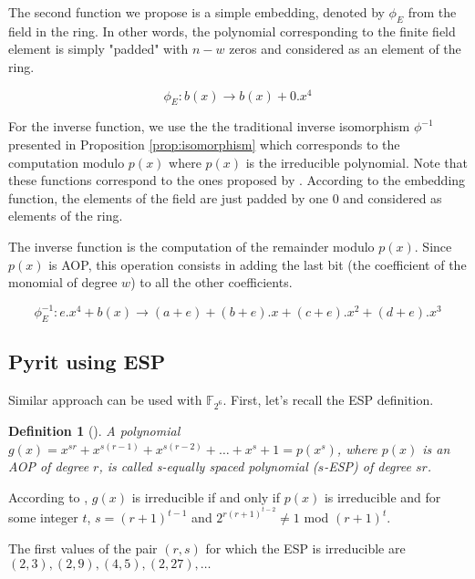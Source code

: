 \documentclass[conference]{IEEEtran}
\newtheorem{mydef}{Definition}
\begin{document}
The second function we propose is a simple embedding, denoted by $\phi_E$ from the field in the ring. In other words, the polynomial corresponding to the finite field element is simply "padded" with $n-w$ zeros and considered as an element of the ring. 

	\begin{displaymath}
		\phi_E : b(x) \rightarrow b(x) + 0.x^4
	\end{displaymath}

For the inverse function, we use the the traditional inverse isomorphism $\phi^{-1}$ presented in Proposition \ref{prop:isomorphism} which corresponds to the computation modulo $p(x)$ where $p(x)$ is the irreducible polynomial. Note that these functions correspond to the ones proposed by \cite{ITOH1989}. According to the embedding function, the elements of the field are just padded by one $0$ and considered as elements of the ring. 

The inverse function is the computation of the remainder modulo $p(x)$. Since $p(x)$ is AOP, this operation consists in adding the last bit (the coefficient of the monomial of degree $w$) to all the other coefficients. 

	\begin{displaymath}
		\phi_E^{-1} : e.x^4 + b(x) \rightarrow (a+e)+(b+e).x+(c+e).x^2+(d+e).x^3
	\end{displaymath}



\subsection{Pyrit using ESP}
\label{sec:esp}

Similar approach can be used with $\mathbb{F}_{2^6}$. First, let's recall the ESP definition.
\begin{mydef}[\cite{ITOH1989}]
	
	\label{def:esp}	
	A polynomial $g(x)=x^{sr}+x^{s(r-1)}+x^{s(r-2)}+\ldots + x^s + 1=p(x^s)$, where $p(x)$ is an AOP of degree $r$, is called s-equally spaced polynomial ($s$-ESP) of degree $sr$.
	
\end{mydef}

According to \cite[Theorem 3]{ITOH1989}, $g(x)$ is irreducible if and only if $p(x)$ is irreducible and for some integer $t$, $s=(r+1)^{t-1}$ and $2^{r(r+1)^{t-2}}\not=1$ mod $(r+1)^t$.  

The first values of the pair $(r,s)$ for which the ESP is irreducible are $(2,3), (2,9), (4,5), (2,27),\ldots$ 
\end{document}
